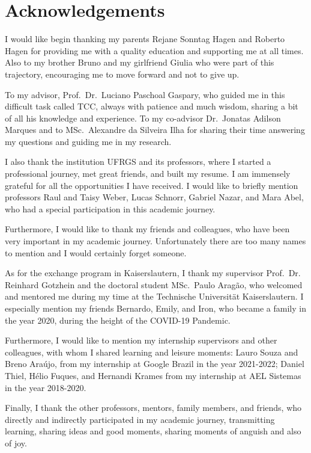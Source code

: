 \chapter*{Acknowledgements}

I would like begin thanking my parents Rejane Sonntag Hagen and Roberto Hagen for providing me with a quality education and supporting me at all times. Also to my brother Bruno and my girlfriend Giulia who were part of this trajectory, encouraging me to move forward and not to give up.

To my advisor, Prof.~Dr.~Luciano Paschoal Gaspary, who guided me in this difficult task called TCC, always with patience and much wisdom, sharing a bit of all his knowledge and experience. To my co-advisor Dr.~Jonatas Adilson Marques and to MSc.~Alexandre da Silveira Ilha for sharing their time answering my questions and guiding me in my research.

I also thank the institution UFRGS and its professors, where I started a professional journey, met great friends, and built my resume. I am immensely grateful for all the opportunities I have received. I would like to briefly mention professors Raul and Taisy Weber, Lucas Schnorr, Gabriel Nazar, and Mara Abel, who had a special participation in this academic journey.

Furthermore, I would like to thank my friends and colleagues, who have been very important in my academic journey. Unfortunately there are too many names to mention and I would certainly forget someone.

As for the exchange program in Kaiserslautern, I thank my supervisor Prof.~Dr. Reinhard Gotzhein and the doctoral student MSc.~Paulo Aragão, who welcomed and mentored me during my time at the Technische Universität Kaiserslautern. I especially mention my friends Bernardo, Emily, and Iron, who became a family in the year 2020, during the height of the COVID-19 Pandemic.

Furthermore, I would like to mention my internship supervisors and other colleagues, with whom I shared learning and leisure moments: Lauro Souza and Breno Araújo, from my internship at Google Brazil in the year 2021-2022; Daniel Thiel, Hélio Fuques, and Hernandi Krames from my internship at AEL Sistemas in the year 2018-2020.

Finally, I thank the other professors, mentors, family members, and friends, who directly and indirectly participated in my academic journey, transmitting learning, sharing ideas and good moments, sharing moments of anguish and also of joy.

